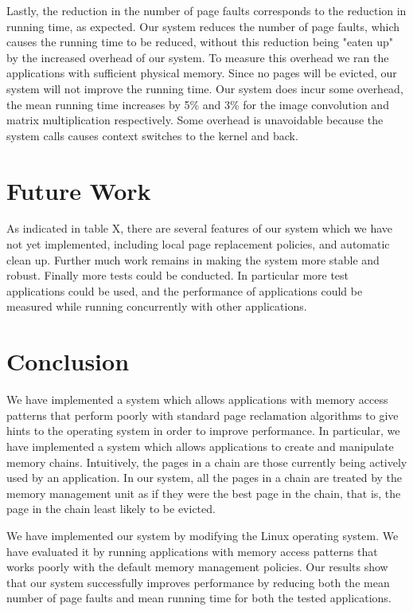 \documentclass[10pt,a4paper,twocolumn]{article}
\begin{document}
Lastly, the reduction in the number of page faults corresponds to the reduction in running time, as
expected. Our system reduces the number of page faults, which causes the running time to be reduced,
without this reduction being "eaten up" by the increased overhead of our system. To measure this
overhead we ran the applications with sufficient physical memory. Since no pages will be evicted,
our system will not improve the running time. Our system does incur some overhead, the mean running
time increases by 5\% and 3\% for the image convolution and matrix multiplication respectively. Some
overhead is unavoidable because the system calls causes context switches to the kernel and back.

\section{Future Work}
As indicated in table X, there are several features of our system which we have not yet implemented,
including local page replacement policies, and automatic clean up. Further much work remains in
making the system more stable and robust. Finally more tests could be conducted. In particular more
test applications could be used, and the performance of applications could be measured while running
concurrently with other applications.

\section{Conclusion}
We have implemented a system which allows applications with memory access
patterns that perform poorly with standard page reclamation algorithms to give hints to the
operating system in order to improve performance. In particular, we have implemented a system which
allows applications to create and manipulate memory chains. Intuitively, the pages in a chain are
those currently being actively used by an application. In our system, all the pages in a chain are
treated by the memory management unit as if they were the best page in the chain, that is, the page
in the chain least likely to be evicted.

We have implemented our system by modifying the Linux operating system. We have evaluated it by
running applications with memory access patterns that works poorly with the default memory
management policies. Our results show that our system successfully improves performance by reducing
both the mean number of page faults and mean running time for both the tested applications.



\end{document}
